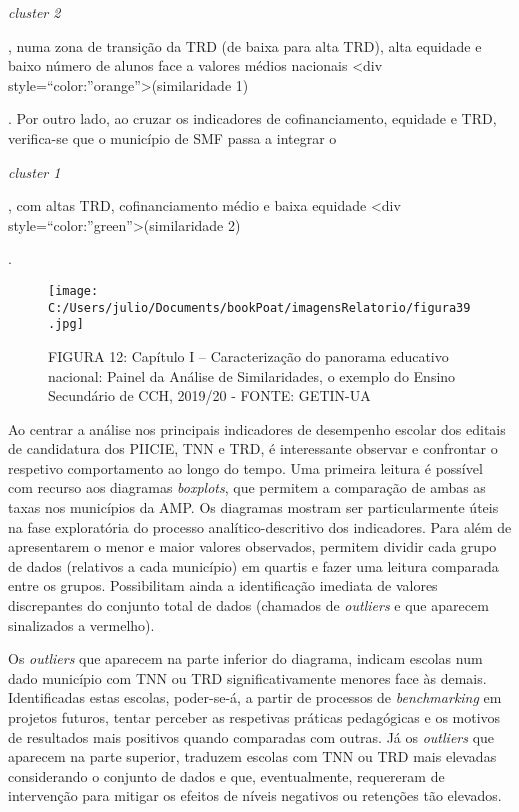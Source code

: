 \documentclass[
]{book}
\begin{document}
\emph{cluster 2}

, numa zona de transição da TRD (de baixa para alta TRD), alta equidade e baixo número de alunos face a valores médios nacionais \textless div style=``color:''orange''\textgreater(similaridade 1)

. Por outro lado, ao cruzar os indicadores de cofinanciamento, equidade e TRD, verifica-se que o município de SMF passa a integrar o

\emph{cluster 1}

, com altas TRD, cofinanciamento médio e baixa equidade \textless div style=``color:''green''\textgreater(similaridade 2)

.

\begin{figure}
\centering
\texttt{[image: C:/Users/julio/Documents/bookPoat/imagensRelatorio/figura39.jpg]}
\caption{FIGURA 12: Capítulo I -- Caracterização do panorama educativo nacional: Painel da Análise de Similaridades, o exemplo do Ensino Secundário de CCH, 2019/20 - FONTE: GETIN-UA}
\end{figure}

Ao centrar a análise nos principais indicadores de desempenho escolar dos editais de candidatura dos PIICIE, TNN e TRD, é interessante observar e confrontar o respetivo comportamento ao longo do tempo. Uma primeira leitura é possível com recurso aos diagramas \emph{boxplots}, que permitem a comparação de ambas as taxas nos municípios da AMP. Os diagramas mostram ser particularmente úteis na fase exploratória do processo analítico-descritivo dos indicadores. Para além de apresentarem o menor e maior valores observados, permitem dividir cada grupo de dados (relativos a cada município) em quartis e fazer uma leitura comparada entre os grupos. Possibilitam ainda a identificação imediata de valores discrepantes do conjunto total de dados (chamados de \emph{outliers} e que aparecem sinalizados a vermelho).

Os \emph{outliers} que aparecem na parte inferior do diagrama, indicam escolas num dado município com TNN ou TRD significativamente menores face às demais. Identificadas estas escolas, poder-se-á, a partir de processos de \emph{benchmarking} em projetos futuros, tentar perceber as respetivas práticas pedagógicas e os motivos de resultados mais positivos quando comparadas com outras. Já os \emph{outliers} que aparecem na parte superior, traduzem escolas com TNN ou TRD mais elevadas considerando o conjunto de dados e que, eventualmente, requereram de intervenção para mitigar os efeitos de níveis negativos ou retenções tão elevados.
\end{document}
